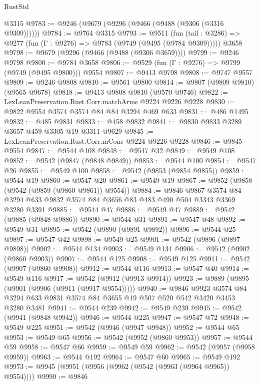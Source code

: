 \begin{lexlean}{RustStd}
\begin{coremodule}
    @3315
@9783 := @9246 (@9679 (@9296 (@9466 (@9488 (@9306 (@3316 @9309))))))
@9784 := @9764 @3315
@9793 := @9511
    (fun (tail : @3286) => @9277 (fun (Γ : @9276) => @9783 (@9749 (@9495 (@9784 @9309)))))
    @3658
@9798 := @9679 (@9296 (@9466 (@9488 (@9306 @3659))))
@9799 := @9246 @9798
@9800 := @9784 @3658
@9806 := @9529 (fun (Γ : @9276) => @9799 (@9749 (@9495 @9800))) @9554
@9807 := @9413 @9798
@9808 := @9747 @9557
@9809 := @9246 @9808
@9810 := @9561 @9800
@9814 := @9807 (@9809 @9810) (@9565 @9678)
@9818 := @9413 @9808 @9810 (@9570 @9746)
@9822 := LexLeanPreservation.Rust.Corr.matchArms @9224 @9226 @9228
@9830 := @9822 @9554 @3574 @3574 @84 @84 @3294 @469 @633
@9831 := @486 @1495
@9832 := @485 @9831
@9833 := @458 @9832
@9841 := @9830 @9833 @3289 @3657 @459 @3305 @19 @3311 @9629
@9845 := LexLeanPreservation.Rust.Corr.mCons @9224 @9226 @9228
@9846 := @9845 @9554
@9847 := @9544 @108
@9848 := @9547 @32
@9849 := @9549 @108
@9852 := @9542 (@9847 (@9848 @9849))
@9853 := @9544 @100
@9854 := @9547 @26
@9855 := @9549 @100
@9858 := @9542 (@9853 (@9854 @9855))
@9859 := @9544 @19
@9860 := @9547 @20
@9861 := @9549 @19
@9867 := @9852 (@9858 (@9542 (@9859 (@9860 @9861)) @9554))
@9884 := @9846
    @9867
    @3574
    @84
    @3294
    @633
    @9832
    @3574
    @84
    @3656
    @83
    @483
    @490
    @504
    @3343
    @3369
    @3280
    @3391
@9885 := @9544 @47
@9886 := @9549 @47
@9889 := @9542 (@9885 (@9848 @9886))
@9890 := @9544 @31
@9891 := @9547 @48
@9892 := @9549 @31
@9895 := @9542 (@9890 (@9891 @9892))
@9896 := @9544 @25
@9897 := @9547 @42
@9898 := @9549 @25
@9901 := @9542 (@9896 (@9897 @9898))
@9902 := @9544 @134
@9903 := @9549 @134
@9906 := @9542 (@9902 (@9860 @9903))
@9907 := @9544 @125
@9908 := @9549 @125
@9911 := @9542 (@9907 (@9860 @9908))
@9912 := @9544 @116
@9913 := @9547 @40
@9914 := @9549 @116
@9917 := @9542 (@9912 (@9913 @9914))
@9923 := @9889 (@9895 (@9901 (@9906 (@9911 (@9917 @9554)))))
@9940 := @9846
    @9923
    @3574
    @84
    @3294
    @633
    @9831
    @3574
    @84
    @3655
    @19
    @507
    @520
    @542
    @3420
    @3453
    @3280
    @3481
@9941 := @9544 @239
@9942 := @9549 @239
@9945 := @9542 (@9941 (@9848 @9942))
@9946 := @9544 @225
@9947 := @9547 @72
@9948 := @9549 @225
@9951 := @9542 (@9946 (@9947 @9948))
@9952 := @9544 @65
@9953 := @9549 @65
@9956 := @9542 (@9952 (@9860 @9953))
@9957 := @9544 @59
@9958 := @9547 @66
@9959 := @9549 @59
@9962 := @9542 (@9957 (@9958 @9959))
@9963 := @9544 @192
@9964 := @9547 @60
@9965 := @9549 @192
@9973 := @9945 (@9951 (@9956 (@9962 (@9542 (@9963 (@9964 @9965)) @9554))))
@9990 := @9846

\end{coremodule}
\end{lexlean}
